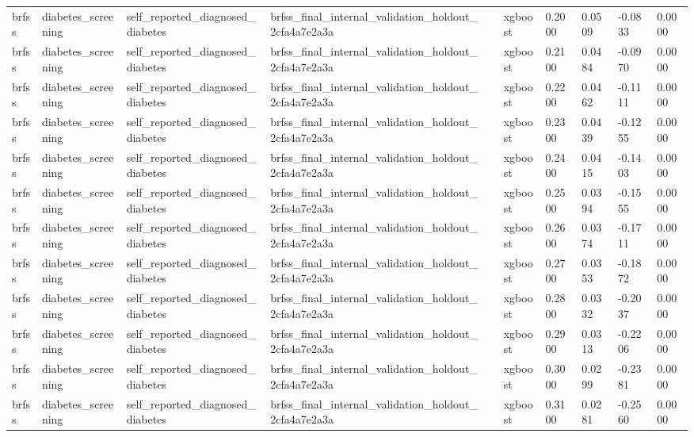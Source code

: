 \begin{tabular}{llllllllll}
brfss & diabetes\_screening & self\_reported\_diagnosed\_diabetes & brfss\_final\_internal\_validation\_holdout\_2cfa4a7e2a3a &  & xgboost & 0.2000 & 0.0509 & -0.0833 & 0.0000 \\
brfss & diabetes\_screening & self\_reported\_diagnosed\_diabetes & brfss\_final\_internal\_validation\_holdout\_2cfa4a7e2a3a &  & xgboost & 0.2100 & 0.0484 & -0.0970 & 0.0000 \\
brfss & diabetes\_screening & self\_reported\_diagnosed\_diabetes & brfss\_final\_internal\_validation\_holdout\_2cfa4a7e2a3a &  & xgboost & 0.2200 & 0.0462 & -0.1111 & 0.0000 \\
brfss & diabetes\_screening & self\_reported\_diagnosed\_diabetes & brfss\_final\_internal\_validation\_holdout\_2cfa4a7e2a3a &  & xgboost & 0.2300 & 0.0439 & -0.1255 & 0.0000 \\
brfss & diabetes\_screening & self\_reported\_diagnosed\_diabetes & brfss\_final\_internal\_validation\_holdout\_2cfa4a7e2a3a &  & xgboost & 0.2400 & 0.0415 & -0.1403 & 0.0000 \\
brfss & diabetes\_screening & self\_reported\_diagnosed\_diabetes & brfss\_final\_internal\_validation\_holdout\_2cfa4a7e2a3a &  & xgboost & 0.2500 & 0.0394 & -0.1555 & 0.0000 \\
brfss & diabetes\_screening & self\_reported\_diagnosed\_diabetes & brfss\_final\_internal\_validation\_holdout\_2cfa4a7e2a3a &  & xgboost & 0.2600 & 0.0374 & -0.1711 & 0.0000 \\
brfss & diabetes\_screening & self\_reported\_diagnosed\_diabetes & brfss\_final\_internal\_validation\_holdout\_2cfa4a7e2a3a &  & xgboost & 0.2700 & 0.0353 & -0.1872 & 0.0000 \\
brfss & diabetes\_screening & self\_reported\_diagnosed\_diabetes & brfss\_final\_internal\_validation\_holdout\_2cfa4a7e2a3a &  & xgboost & 0.2800 & 0.0332 & -0.2037 & 0.0000 \\
brfss & diabetes\_screening & self\_reported\_diagnosed\_diabetes & brfss\_final\_internal\_validation\_holdout\_2cfa4a7e2a3a &  & xgboost & 0.2900 & 0.0313 & -0.2206 & 0.0000 \\
brfss & diabetes\_screening & self\_reported\_diagnosed\_diabetes & brfss\_final\_internal\_validation\_holdout\_2cfa4a7e2a3a &  & xgboost & 0.3000 & 0.0299 & -0.2381 & 0.0000 \\
brfss & diabetes\_screening & self\_reported\_diagnosed\_diabetes & brfss\_final\_internal\_validation\_holdout\_2cfa4a7e2a3a &  & xgboost & 0.3100 & 0.0281 & -0.2560 & 0.0000 \\

\end{tabular}
